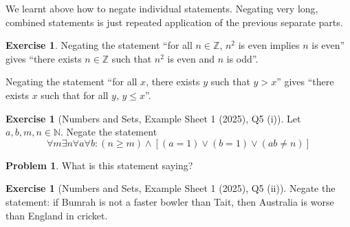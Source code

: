 \documentclass[11pt]{article}
\theoremstyle{definition}
\newtheorem{example}[theorem]{Exercise}
\newtheorem{problem}[theorem]{Problem}
\theoremstyle{remark}
\newcommand{\pqty}[1]{\left(#1\right)}
\newcommand{\bqty}[1]{\left[#1\right]}
\newcommand{\NN}{\mathbb{N}}
\newcommand{\ZZ}{\mathbb{Z}}
\begin{document}
We learnt above how to negate individual statements. Negating very long, combined statements is just repeated application of the previous separate parts.

\begin{example}\label{tmua-6-unit-014}
    Negating the statement ``for all \(n \in \ZZ\), \(n^2\) is even implies \(n\) is even'' gives ``there exists \(n \in \ZZ\) such that \(n^2\) is even and \(n\) is odd''.

    Negating the statement ``for all \(x\), there exists \(y\) such that \(y > x\)'' gives ``there exists \(x\) such that for all \(y\), \(y \leq x\)''.
\end{example}

\begin{example}[Numbers and Sets, Example Sheet 1 (2025), Q5 (i)]\label{tmua-6-unit-015}
    Let \(a, b, m, n \in \NN\). Negate the statement
    \[
        \forall m \exists n \forall a \forall b: \pqty{n \geq m} \land \bqty{\pqty{a = 1} \lor \pqty{b = 1} \lor \pqty{ab \neq n}}
    \]
\end{example}

\begin{problem}\label{tmua-6-unit-016}
    What is this statement saying?
\end{problem}

\begin{example}[Numbers and Sets, Example Sheet 1 (2025), Q5 (ii)]\label{tmua-6-unit-017}
    Negate the statement: if Bumrah is not a faster bowler than Tait, then Australia is worse than England in cricket.
\end{example}
\end{document}
